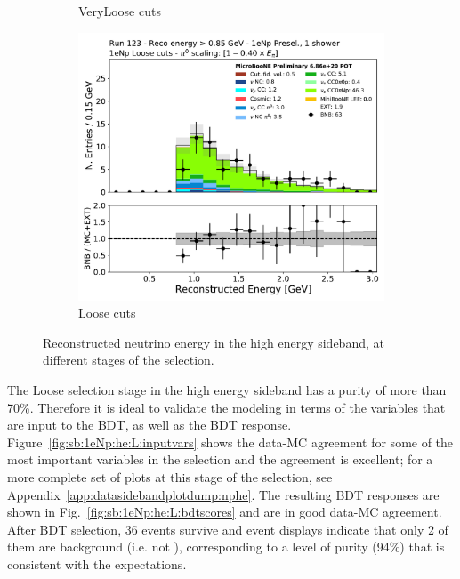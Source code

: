 \begin{figure}[H]
\begin{center}
\begin{subfigure}{0.32\textwidth}
    \caption{\npsel VeryLoose cuts}
    \end{subfigure}
    \begin{subfigure}{0.32\textwidth}
    \includegraphics[width=1.00\textwidth]{Sidebands/Figures/1eNp/HighEnergy/HiEext_NPOneShr_NPL_pi0e040/reco_e_extended.pdf}
    \caption{\npsel Loose cuts}
    \end{subfigure}
\caption{\label{fig:sb:1eNp:he:recoe} Reconstructed neutrino energy in the high energy sideband, at different stages of the \npsel selection.}
    \end{center}
\end{figure}

The Loose selection stage in the high energy sideband has a \npsel purity of more than 70\%. Therefore it is ideal to validate the \npsel modeling in terms of the variables that are input to the BDT, as well as the BDT response. Figure~\ref{fig:sb:1eNp:he:L:inputvars} shows the data-MC agreement for some of the most important variables in the selection and the agreement is excellent; for a more complete set of plots at this stage of the selection, see Appendix~\ref{app:datasidebandplotdump:nphe}. The resulting BDT responses are shown in Fig.~\ref{fig:sb:1eNp:he:L:bdtscores} and are in good data-MC agreement. After BDT selection, 36 events survive and event displays indicate that only 2 of them are background (i.e. not \npsel), corresponding to a level of purity (94\%) that is consistent with the expectations.

